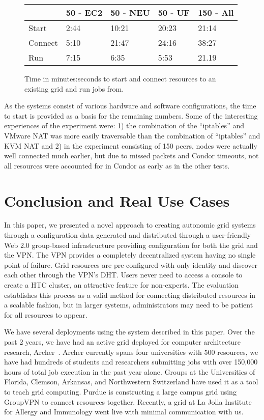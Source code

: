 \documentclass{sig-alternate}
\begin{document}
\begin{figure}[ht]
\setlength{\itemsep}{0pt}
\setlength{\parskip}{0pt}
\centering
\begin{tabular}[c]{|m{1.2cm}||m{1.3cm}|m{1.3cm}|m{1.3cm}|m{1.3cm}|} \hline
& 50 - EC2 & 50 - NEU & 50 - UF & 150 - All \\ \hline\hline
Start & 2:44 & 10:21 & 20:23 & 21:14 \\ \hline
Connect & 5:10 & 21:47 & 24:16 & 38:27\\ \hline
Run & 7:15 & 6:35 & 5:53 & 21.19 \\ \hline
\end{tabular}
\caption{Time in minutes:seconds to start and connect resources to an existing
grid and run jobs from.}
\label{fig:results}
\end{figure}

As the systems consist of various hardware and software configurations, the
time to start is provided as a basis for the remaining numbers.  Some of the
interesting experiences of the experiment were:  1) the combination of the
``iptables'' and VMware NAT was more easily traversable than the combination
of ``iptables'' and KVM NAT and 2) in the experiment consisting of 150 peers,
nodes were actually well connected much earlier, but due to missed packets and
Condor timeouts, not all resources were accounted for in Condor as early as in
the other tests.

\section{Conclusion and Real Use Cases}
\label{conclusion}
In this paper, we presented a novel approach to creating autonomic grid systems
through a configuration data generated and distributed through a user-friendly
Web 2.0 group-based infrastructure providing configuration for both the grid
and the VPN.  The VPN provides a completely decentralized system having no
single point of failure.  Grid resources are pre-configured with only identity
and discover each other through the VPN's DHT.  Users never need to access a
console to create a HTC cluster, an attractive feature for non-experts.  The
evaluation establishes this process as a valid method for connecting distributed
resources in a scalable fashion, but in larger systems, administrators may need
to be patient for all resources to appear.

We have several deployments using the system described in this paper.  Over
the past 2 years, we have had an active grid deployed for computer architecture
research, Archer~\cite{archer}.  Archer currently spans four universities with
500 resources, we have had hundreds of students and researchers submitting jobs
with over 150,000 hours of total job execution in the past year alone.  Groups
at the Universities of Florida, Clemson, Arkansas, and Northwestern Switzerland
have used it as a tool to teach grid computing.  Purdue is constructing a large
campus grid using GroupVPN to connect resources together.  Recently, a grid at
La Jolla Institute for Allergy and Immunology went live with minimal
communication with us.


\small{

\suppressfloats
}
\end{document}

